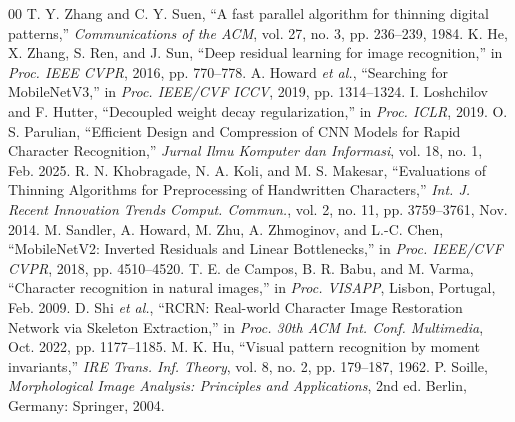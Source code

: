 \documentclass[journal]{IEEEtran}
\begin{document}
\begin{thebibliography}{00}
 T. Y. Zhang and C. Y. Suen, ``A fast parallel algorithm for thinning digital patterns,'' \textit{Communications of the ACM}, vol. 27, no. 3, pp. 236--239, 1984.
 K. He, X. Zhang, S. Ren, and J. Sun, ``Deep residual learning for image recognition,'' in \textit{Proc. IEEE CVPR}, 2016, pp. 770--778.
 A. Howard \textit{et al.}, ``Searching for MobileNetV3,'' in \textit{Proc. IEEE/CVF ICCV}, 2019, pp. 1314--1324.
 I. Loshchilov and F. Hutter, ``Decoupled weight decay regularization,'' in \textit{Proc. ICLR}, 2019.
 O. S. Parulian, ``Efficient Design and Compression of CNN Models for Rapid Character Recognition,'' \textit{Jurnal Ilmu Komputer dan Informasi}, vol. 18, no. 1, Feb. 2025.
 R. N. Khobragade, N. A. Koli, and M. S. Makesar, ``Evaluations of Thinning Algorithms for Preprocessing of Handwritten Characters,'' \textit{Int. J. Recent Innovation Trends Comput. Commun.}, vol. 2, no. 11, pp. 3759--3761, Nov. 2014.
 M. Sandler, A. Howard, M. Zhu, A. Zhmoginov, and L.-C. Chen, ``MobileNetV2: Inverted Residuals and Linear Bottlenecks,'' in \textit{Proc. IEEE/CVF CVPR}, 2018, pp. 4510--4520.
 T. E. de Campos, B. R. Babu, and M. Varma, ``Character recognition in natural images,'' in \textit{Proc. VISAPP}, Lisbon, Portugal, Feb. 2009.
 D. Shi \textit{et al.}, ``RCRN: Real-world Character Image Restoration Network via Skeleton Extraction,'' in \textit{Proc. 30th ACM Int. Conf. Multimedia}, Oct. 2022, pp. 1177--1185.
 M. K. Hu, ``Visual pattern recognition by moment invariants,'' \textit{IRE Trans. Inf. Theory}, vol. 8, no. 2, pp. 179--187, 1962.
 P. Soille, \textit{Morphological Image Analysis: Principles and Applications}, 2nd ed. Berlin, Germany: Springer, 2004.

\end{thebibliography}
\end{document}
